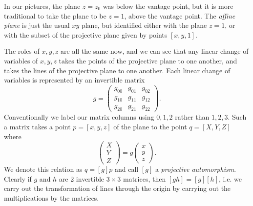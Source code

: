 In our pictures, the plane \(z=z_0\) was below the vantage point, but it is more traditional to take the plane to be \(z=1\), above the vantage point.
The \emph{affine plane} is just the usual \(xy\) plane, but identified either with the plane \(z=1\), or with the subset of the projective plane given by points \([x,y,1]\).

The roles of \(x,y,z\) are all the same now, and we can see that any linear change of variables of \(x,y,z\) takes the points of the projective plane to one another, and takes the lines of the projective plane to one another.
Each linear change of variables is represented by an invertible matrix
\[
g=
\begin{pmatrix}
g_{00} & g_{01} & g_{02} \\
g_{10} & g_{11} & g_{12} \\
g_{20} & g_{21} & g_{22}
\end{pmatrix}.
\]
Conventionally we label our matrix columns using \(0,1,2\) rather than \(1,2,3\).
Such a matrix takes a point \(p=[x,y,z]\) of the plane to the point \(q=[X,Y,Z]\) where
\[
\begin{pmatrix}
X \\
Y \\
Z
\end{pmatrix}
=
g
\begin{pmatrix}
x \\
y \\
z
\end{pmatrix}.
\]
We denote this relation as \(q=[g]p\) and call \([g]\) a \emph{projective automorphism}.
Clearly if \(g\) and \(h\) are 2 invertible \(3 \times 3\) matrices, then \([gh]=[g][h]\), i.e. we carry out the transformation of lines through the origin by carrying out the multiplications by the matrices.

